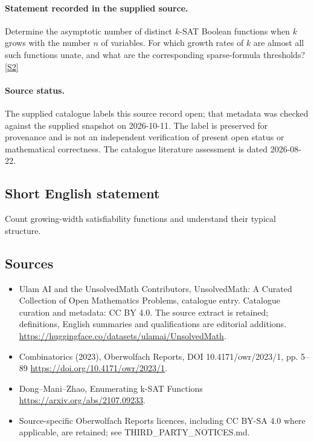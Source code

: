 \documentclass[11pt]{article}
\begin{document}
\paragraph{Statement recorded in the supplied source.}
Determine the asymptotic number of distinct $k$-SAT Boolean functions when $k$ grows with the number $n$ of variables. For which growth rates of $k$ are almost all such functions unate, and what are the corresponding sparse-formula thresholds? \href{https://doi.org/10.4171/owr/2023/1}{[S2]}
\paragraph{Source status.}
The supplied catalogue labels this source record open; that metadata was checked against the supplied snapshot on 2026-10-11. The label is preserved for provenance and is not an independent verification of present open status or mathematical correctness. The catalogue literature assessment is dated 2026-08-22.
\subsection{Short English statement}
Count growing-width satisfiability functions and understand their typical structure.
\subsection{Sources}
\begin{itemize}
\item[S1] Ulam AI and the UnsolvedMath Contributors, UnsolvedMath: A Curated Collection of Open Mathematics Problems, catalogue entry. Catalogue curation and metadata: CC BY 4.0. The source extract is retained; definitions, English summaries and qualifications are editorial additions.
\url{https://huggingface.co/datasets/ulamai/UnsolvedMath}.
\item[S2] Combinatorics (2023), Oberwolfach Reports, DOI 10.4171/owr/2023/1, pp. 5--89
\url{https://doi.org/10.4171/owr/2023/1}.
\item[S3] Dong--Mani--Zhao, Enumerating k-SAT Functions
\url{https://arxiv.org/abs/2107.09233}.
\item Source-specific Oberwolfach Reports licences, including CC BY-SA 4.0 where applicable, are retained; see THIRD\_PARTY\_NOTICES.md.
\end{itemize}
\end{document}
